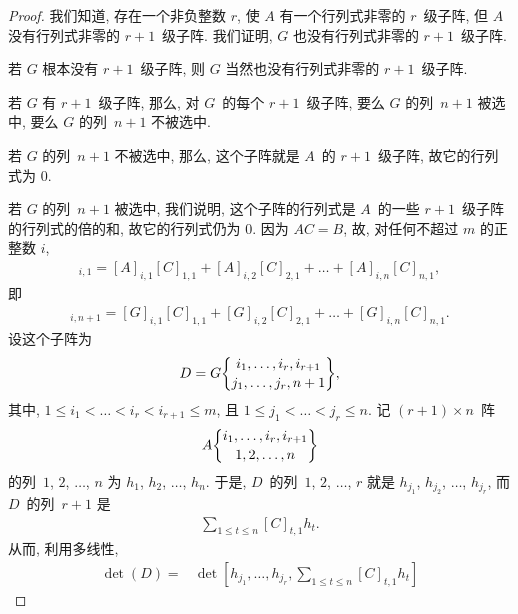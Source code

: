 \documentclass[../libro.tex]{subfiles}
\begin{document}
\begin{proof}
    我们知道, 存在一个非负整数 \(r\),
    使 \(A\) 有一个行列式非零的 \(r\)~级子阵,
    但 \(A\) 没有行列式非零的 \(r+1\)~级子阵.
    我们证明,
    \(G\) 也没有行列式非零的 \(r+1\)~级子阵.

    若 \(G\) 根本没有 \(r+1\)~级子阵,
    则 \(G\) 当然也没有行列式非零的 \(r+1\)~级子阵.

    若 \(G\) 有 \(r+1\)~级子阵,
    那么,
    对 \(G\)~的每个 \(r+1\)~级子阵,
    要么 \(G\) 的列~\(n+1\) 被选中,
    要么 \(G\) 的列~\(n+1\) 不被选中.

    若 \(G\) 的列~\(n+1\) 不被选中,
    那么, 这个子阵就是 \(A\)~的 \(r+1\)~级子阵,
    故它的行列式为 \(0\).

    若 \(G\) 的列~\(n+1\) 被选中,
    我们说明,
    这个子阵的行列式是
    \(A\)~的一些 \(r+1\)~级子阵的行列式的倍的和,
    故它的行列式仍为 \(0\).
    因为 \(AC = B\), 故,
    对任何不超过 \(m\) 的正整数 \(i\),
    \begin{align*}
        [B]_{i,1}
        = [A]_{i,1} [C]_{1,1} + [A]_{i,2} [C]_{2,1}
        + \dots + [A]_{i,n} [C]_{n,1},
    \end{align*}
    即
    \begin{align*}
        [G]_{i,n+1}
        = [G]_{i,1} [C]_{1,1} + [G]_{i,2} [C]_{2,1}
        + \dots + [G]_{i,n} [C]_{n,1}.
    \end{align*}
    设这个子阵为
    \begin{align*}
        D = G\submat{i_1,\dots,i_r,i_{r+1}}{j_1,\dots,j_r,n+1},
    \end{align*}
    其中,
    \(1 \leq i_1 < \dots < i_r < i_{r+1} \leq m\),
    且 \(1 \leq j_1 < \dots < j_r \leq n\).
    记 \((r+1) \times n\)~阵
    \begin{align*}
        A\submat{i_1,\dots,i_r,i_{r+1}}{1,2,\dots,n}
    \end{align*}
    的列~\(1\), \(2\), \(\dots\), \(n\) 为
    \(h_1\), \(h_2\), \(\dots\), \(h_n\).
    于是, \(D\)~的列~\(1\), \(2\), \(\dots\), \(r\) 就是
    \(h_{j_1}\), \(h_{j_2}\), \(\dots\), \(h_{j_r}\),
    而 \(D\)~的列~\(r+1\) 是
    \begin{align*}
        \sum_{1 \leq t \leq n}
        {[C]_{t,1} h_t}.
    \end{align*}
    从而, 利用多线性,
    \begin{align*}
        \det {(D)}
        = {} &
        \det {
            \left[
                h_{j_1}, \dots, h_{j_r},
                \sum_{1 \leq t \leq n}
                {[C]_{t,1} h_t}
            \right]
}
\end{align*}
\end{proof}
\end{document}
